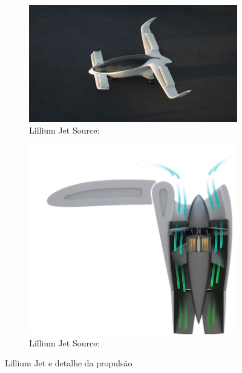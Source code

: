 \begin{figure}[h]
    \begin{subfigure}[t]{0.47\textwidth}
        \centering
        \includegraphics[width=\textwidth]{Imagens/Lilium-Jet-Top-Side_result1.jpg}
        \caption{Lillium Jet Source:\cite{noauthor_2022-ne}}
        \label{LilliumJet}
    \end{subfigure}
    \hfill
    \begin{subfigure}[t]{0.47\textwidth}
        \centering
        \includegraphics[width=\textwidth]{Imagens/tiltrotorlillium.PNG}
        \caption{Lillium Jet Source:\cite{noauthor_2022-ne}}
        \label{LilliumJettiltrotor}
    \end{subfigure}
    \caption{Lillium Jet e detalhe da propulsão}
\end{figure}
